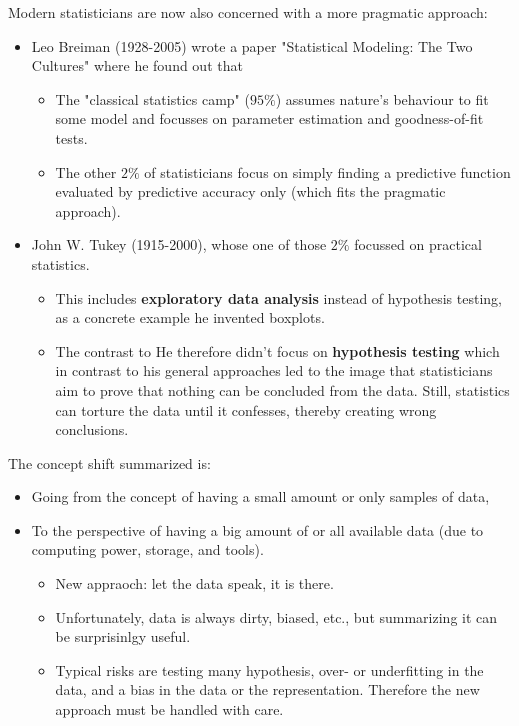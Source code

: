 Modern statisticians are now also concerned with a more pragmatic approach:
\begin{itemize}
  \item Leo Breiman (1928-2005) wrote a paper "Statistical Modeling: The Two Cultures" where he found out that
  \begin{itemize}
    \item The "classical statistics camp" ($95\%$) assumes nature's behaviour to fit some model and focusses on parameter estimation and goodness-of-fit tests.
    \item The other $2\%$ of statisticians focus on simply finding a predictive function evaluated by predictive accuracy only (which fits the pragmatic approach).
  \end{itemize}
  \item John W. Tukey (1915-2000), whose one of those $2\%$ focussed on practical statistics.
  \begin{itemize}
    \item This includes \textbf{exploratory data analysis} instead of hypothesis testing, as a concrete example he invented boxplots.
    \item The contrast to He therefore didn't focus on \textbf{hypothesis testing} which in contrast to his general approaches led to the image that statisticians aim to prove that nothing can be concluded from the data. Still, statistics can torture the data until it confesses, thereby creating wrong conclusions.
  \end{itemize}
\end{itemize}

The concept shift summarized is:
\begin{itemize}
  \item Going from the concept of having a small amount or only samples of data, 
  \item To the perspective of having a big amount of or all available data (due to computing power, storage, and tools).
  \begin{itemize}
    \item New appraoch: let the data speak, it is there.
    \item Unfortunately, data is always dirty, biased, etc., but summarizing it can be surprisinlgy useful.
    \item Typical risks are testing many hypothesis, over- or underfitting in the data, and a bias in the data or the representation. Therefore the new approach must be handled with care.
  \end{itemize}
\end{itemize}

